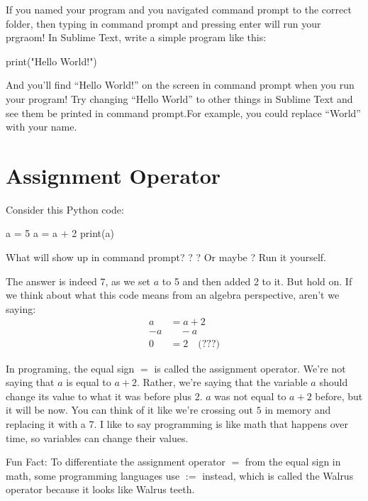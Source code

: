 \documentclass[12pt]{scrartcl}
\begin{document}
If you named your program  and you navigated command prompt to the correct folder, then typing  in command prompt and pressing enter will run your prgraom! In Sublime Text, write a simple program like this:
\begin{python}
print("Hello World!")
\end{python}
And you'll find ``Hello World!'' on the screen in command prompt when you run your program! Try changing ``Hello World'' to other things in Sublime Text and see them be printed in command prompt.For example, you could replace ``World'' with your name.

\section{Assignment Operator}
Consider this Python code:
\begin{python}
    a = 5
    a = a + 2
    print(a)
\end{python}
What will show up in command prompt? ? ? Or maybe ? Run it yourself.

The answer is indeed 7, as we set $a$ to 5 and then added 2 to it. But hold on. If we think about what this code means from an algebra perspective, aren't we saying:
\begin{align*}
    a &= a + 2 \\
    -a&\quad-a \\
    0 &= 2 \quad \text{(???)}
\end{align*}

In programing, the equal sign $=$ is called the assignment operator. We're not saying that $a$ is equal to $a+2.$ Rather,  we're saying that the variable $a$ should change its value to what it was before plus 2. $a$ was not equal to $a+2$ before, but it will be now. You can think of it like we're crossing out $5$ in memory and replacing it with a 7. I like to say programming is like math that happens over time, so variables can change their values.

Fun Fact: To differentiate the assignment operator $=$ from the equal sign in math, some programming languages use $:=$ instead, which is called the Walrus operator because it looks like Walrus teeth.
\end{document}
